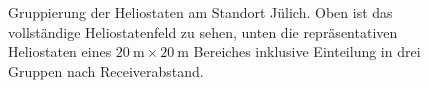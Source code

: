 \begin{figure}[h!]
    \centering
    \setlength{\fboxsep}{5pt}
    \setlength{\fboxrule}{1pt}
\caption[Gruppierung der Heliostaten am Standort Jülich. Oben ist das vollständige Heliostatenfeld zu sehen, unten die repräsentativen Heliostaten eines $\SI{20}{\metre} \times \SI{20}{\metre}$ Bereiches inklusive Einteilung in drei Gruppen nach Receiverabstand.]{Gruppierung der Heliostaten am Standort Jülich. Oben ist das vollständige Heliostatenfeld zu sehen, unten die repräsentativen Heliostaten eines $\SI{20}{\metre} \times \SI{20}{\metre}$ Bereiches inklusive Einteilung in drei Gruppen nach Receiverabstand.}
    \label{fig_HeliostatenfeldGruppen}
\end{figure}

